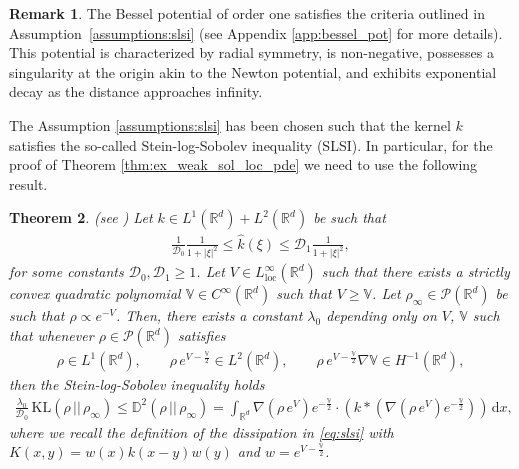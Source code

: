 \documentclass[reqno, 11pt]{amsart}
\numberwithin{equation}{section}
\newtheorem{thm}{Theorem}[section]
\theoremstyle{definition}
\newtheorem{rem}[thm]{Remark}
\begin{document}
\begin{rem}
    \label{rem:ass_expl}
    The Bessel potential of order one satisfies the criteria outlined in Assumption~\ref{assumptions:slsi} (see Appendix \ref{app:bessel_pot} for more details). This potential is characterized by radial symmetry, is non-negative, possesses a singularity at the origin akin to the Newton potential, and exhibits exponential decay as the distance approaches infinity.
\end{rem}

The Assumption \ref{assumptions:slsi} has been chosen such that the kernel $k$ satisfies the so-called Stein-log-Sobolev inequality (SLSI). In particular, for the proof of Theorem \ref{thm:ex_weak_sol_loc_pde} we need to use the following result.

\begin{thm}{(see \cite[Theorem 1.1, Remark 1.2]{carrillo_skrzeczkowski_warnett_2024_stein})}
    \label{thm:slsi}
    Let $k\in L^1(\mathbb{R}^{d})+ L^2(\mathbb{R}^{d})$ be such that
    \begin{align*}
        \frac{1}{\mathcal{D}_0}\frac{1}{1+|\xi|^2}\leq \hat{k}(\xi)\leq \mathcal{D}_1\frac{1}{1+|\xi|^2},
    \end{align*}
    for some constants $\mathcal{D}_0, \mathcal{D}_1\geq 1$. Let $V\in L_\mathrm{loc}^\infty(\mathbb{R}^{d})$ such that there exists a strictly convex quadratic polynomial $\mathbb{V}\in C^\infty(\mathbb{R}^{d})$ such that $V\geq \mathbb{V}$. Let $\rho_\infty\in\mathscr{P}(\mathbb{R}^{d})$ be such that $\rho\propto e^{-V}$. Then, there exists a constant $\lambda_0$ depending only on $V$, $\mathbb{V}$ such that whenever $\rho\in \mathscr{P}(\mathbb{R}^{d})$ satisfies
    \begin{align*}
        \rho\in L^1(\mathbb{R}^{d}),\qquad
        \rho \, e^{V-\frac{\mathbb{V}}{2}}\in L^2(\mathbb{R}^{d}),\qquad
        \rho \, e^{V-\frac{\mathbb{V}}{2}}\nabla\mathbb{V}\in H^{-1}(\mathbb{R}^{d}),
    \end{align*}
    then the Stein-log-Sobolev inequality holds
    \begin{align}
        \label{eq:thm_slsi}
        \frac{\lambda_0}{\mathcal{D}_0}\,\mathrm{KL}(\rho\,||\,\rho_\infty)
        \leq \mathbb{D}^2(\rho\,||\,\rho_\infty)
        =\int_{\mathbb{R}^{d}}\nabla (\rho\, e^V)e^{-\frac{\mathbb{V}}{2}}\cdot (k\ast (\nabla (\rho \, e^V)e^{-\frac{\mathbb{V}}{2}}))\,\mathrm{d} x,
    \end{align}
    where we recall the definition of the dissipation in \eqref{eq:slsi} with $K(x,y)=w(x) k(x-y) w(y)$ and $w=e^{V-\frac{\mathbb{V}}{2}}$.
\end{thm}
\end{document}
